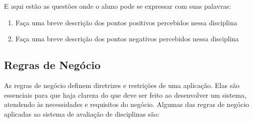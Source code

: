 E aqui estão as questões onde o aluno pode se expressar com suas palavras:
\begin{enumerate}
\item Faça uma breve descrição dos pontos positivos percebidos nessa disciplina
\item Faça uma breve descrição dos pontos negativos percebidos nessa disciplina
\end{enumerate}


\subsection{Regras de Negócio}
As regras de negócio definem diretrizes e restrições de uma aplicação. Elas são essenciais para que haja clareza do que deve ser feito ao desenvolver um sistema, atendendo às necessidades e requisitos do negócio. Algumas das regras de negócio aplicadas ao sistema de avaliação de disciplinas são:


